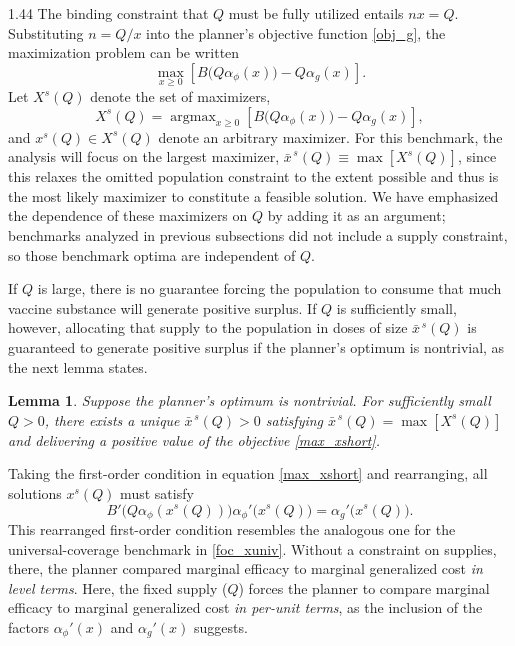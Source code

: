\documentclass[12pt]{article}
\DeclareMathOperator*{\argmax}{argmax}
\newcommand{\efficacy}{\phi}
\newcommand{\general}{g}
\newcommand{\benefit}{B}
\newcommand{\xshort}{x^{s}}
\newcommand{\Xshort}{X^{s}}
\newcommand{\xshortbar}{\bar{x}^{\,s}}
\newcommand{\perunit}[1]{\alpha_{#1}}
\newtheorem{lemma}{Lemma}
\begin{document}
\begin{spacing}{1.44}
The binding constraint that $Q$ must be fully utilized entails $n x =
Q$. Substituting $n = Q/x$ into the planner's objective function
\eqref{obj_g}, the maximization problem can be written
\begin{equation}
\label{max_xshort}
\max_{x \geq 0} \left[ \benefit \! \bigl( Q \perunit{\efficacy}\!(x)
  \bigr) - Q \perunit{\general}\!(x) \right].
\end{equation}
Let $\Xshort\!(Q)$ denote the set of maximizers,
\begin{equation}
\label{argmax_xshort}
\Xshort\!(Q) = \argmax_{x \geq 0} \left[ \benefit \! \bigl( Q
  \perunit{\efficacy}\!(x) \bigr) - Q \perunit{\general}\!(x) \right],
\end{equation}
and $\xshort\!(Q) \in \Xshort\!(Q)$ denote an arbitrary maximizer. For
this benchmark, the analysis will focus on the largest maximizer,
$\xshortbar\!(Q) \equiv \max [ \Xshort\!(Q) ]$, since this relaxes the
omitted population constraint to the extent possible and thus is the
most likely maximizer to constitute a feasible solution. We have
emphasized the dependence of these maximizers on $Q$ by adding it as
an argument; benchmarks analyzed in previous subsections did not
include a supply constraint, so those benchmark optima are independent
of $Q$.

If $Q$ is large, there is no guarantee forcing the population to
consume that much vaccine substance will generate positive surplus. If
$Q$ is sufficiently small, however, allocating that supply to the
population in doses of size $\xshortbar\!(Q)$ is guaranteed to
generate positive surplus if the planner's optimum is nontrivial, as
the next lemma states.
\begin{lemma}
\label{l:xshort}
\singlespace
Suppose the planner's optimum is nontrivial. For sufficiently small $Q
> 0$, there exists a unique $\xshortbar\!(Q) > 0$ satisfying
$\xshortbar\!(Q) = \max[\Xshort\!(Q)]$ and delivering a positive value
of the objective \eqref{max_xshort}.
\end{lemma}

Taking the first-order condition in equation \eqref{max_xshort} and
rearranging, all solutions $\xshort\!(Q)$ must satisfy
\begin{equation}
\label{foc_xshort}
\benefit' \! \bigl( Q \perunit{\efficacy}\!(\xshort\!(Q)) \bigr)
\perunit{\efficacy}'\! \bigl( \xshort\!(Q) \bigr) =
\perunit{\general}' \! \bigl( \xshort\!(Q) \bigr).
\end{equation}
This rearranged first-order condition resembles the analogous one for
the universal-coverage benchmark in \eqref{foc_xuniv}. Without a
constraint on supplies, there, the planner compared marginal efficacy
to marginal generalized cost {\em in level terms}. Here, the fixed
supply ($Q$) forces the planner to compare marginal efficacy to
marginal generalized cost {\em in per-unit terms}, as the inclusion of
the factors $\perunit{\efficacy}' \!(x)$ and
$\perunit{\general}'\!(x)$ suggests.


\end{spacing}
\end{document}
